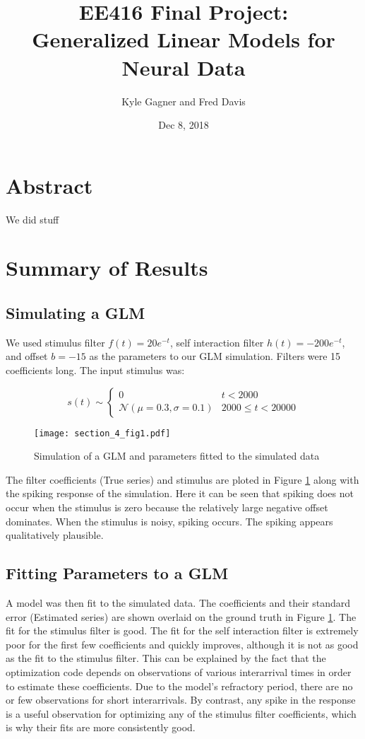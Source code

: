 \documentclass[letterpaper,titlepage,10pt]{article}
\title{EE416 Final Project:\\Generalized Linear Models for Neural Data}
\date{Dec 8, 2018}
\author{Kyle Gagner and Fred Davis}
\begin{document}
\maketitle
\section{Abstract}
We did stuff
\section{Summary of Results}

\subsection{Simulating a GLM}

We used stimulus filter $f(t)=20e^{-t}$, self interaction filter $h(t)=-200e^{-t}$, and offset $b=-15$ as the
parameters to our GLM simulation. Filters were 15 coefficients long. The input stimulus was:

$$s(t)\sim
\begin{cases}
0 & t < 2000\\
\mathcal{N}(\mu=0.3, \sigma=0.1) & 2000 \leq t < 20000
\end{cases}$$

\begin{figure}[h]
\texttt{[image: section\_4\_fig1.pdf]}
\caption{Simulation of a GLM and parameters fitted to the simulated data}
\label{fig41}
\end{figure}

The filter coefficients (True series) and stimulus are ploted in Figure \ref{fig41} along with the spiking
response of the simulation. Here it can be seen that spiking does not occur when the stimulus is zero because the
relatively large negative offset dominates. When the stimulus is noisy, spiking occurs. The spiking appears
qualitatively plausible.

\subsection{Fitting Parameters to a GLM}

A model was then fit to the simulated data. The coefficients and their standard error (Estimated series) are shown
overlaid on the ground truth in Figure \ref{fig41}. The fit for the stimulus filter is good. The fit for the
self interaction filter is extremely poor for the first few coefficients and quickly improves, although it is not as
good as the fit to the stimulus filter. This can be explained by the fact that the optimization code depends on
observations of various interarrival times in order to estimate these coefficients. Due to the model's refractory
period, there are no or few observations for short interarrivals. By contrast, any spike in the response is a useful
observation for optimizing any of the stimulus filter coefficients, which is why their fits are more consistently good.
\end{document}
